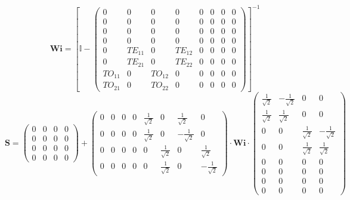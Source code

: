 \[ \mathbf{Wi} =  \left[ \mathbb{I}  - \left(\begin{array}{cccccccc} 0
& 0 & 0 & 0 & 0 & 0 & 0 & 0 \\ 0 & 0 & 0 & 0 & 0 & 0 & 0 & 0 \\ 0 & 0
& 0 & 0 & 0 & 0 & 0 & 0 \\ 0 & 0 & 0 & 0 & 0 & 0 & 0 & 0 \\ 0 &
TE_{11} & 0 & TE_{12} & 0 & 0 & 0 & 0 \\ 0 & TE_{21} & 0 & TE_{22} & 0
& 0 & 0 & 0 \\ TO_{11} & 0 & TO_{12} & 0 & 0 & 0 & 0 & 0 \\ TO_{21} &
0 & TO_{22} & 0 & 0 & 0 & 0 & 0 \end{array}\right) \right]^{-1}  \]
\[ \mathbf{S} = \left(\begin{array}{cccc} 0 & 0 & 0 & 0 \\ 0 & 0 & 0 &
0 \\ 0 & 0 & 0 & 0 \\ 0 & 0 & 0 & 0 \end{array}\right) +
\left(\begin{array}{cccccccc} 0 & 0 & 0 & 0 & \frac{1}{\sqrt{2}} & 0 &
\frac{1}{\sqrt{2}} & 0 \\ 0 & 0 & 0 & 0 & \frac{1}{\sqrt{2}} & 0 &
-\frac{1}{\sqrt{2}} & 0 \\ 0 & 0 & 0 & 0 & 0 & \frac{1}{\sqrt{2}} & 0
& \frac{1}{\sqrt{2}} \\ 0 & 0 & 0 & 0 & 0 & \frac{1}{\sqrt{2}} & 0 &
-\frac{1}{\sqrt{2}} \end{array}\right) \cdot \mathbf{Wi}
\cdot\left(\begin{array}{cccc} \frac{1}{\sqrt{2}} &
-\frac{1}{\sqrt{2}} & 0 & 0 \\ \frac{1}{\sqrt{2}} & \frac{1}{\sqrt{2}}
& 0 & 0 \\ 0 & 0 & \frac{1}{\sqrt{2}} & -\frac{1}{\sqrt{2}} \\ 0 & 0 &
\frac{1}{\sqrt{2}} & \frac{1}{\sqrt{2}} \\ 0 & 0 & 0 & 0 \\ 0 & 0 & 0
& 0 \\ 0 & 0 & 0 & 0 \\ 0 & 0 & 0 & 0 \end{array}\right) \]
